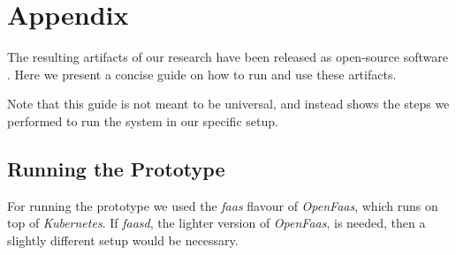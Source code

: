 \chapter{Appendix}

The resulting artifacts of our research have been released as open-source software \cite{thesis-github}. Here we present a concise guide on how to run and use these artifacts.

Note that this guide is not meant to be universal, and instead shows the steps we performed to run the system in our specific setup.

\section{Running the Prototype}
For running the prototype we used the \textit{faas} flavour of \textit{OpenFaas}, which runs on top of \textit{Kubernetes}. If \textit{faasd}, the lighter version of \textit{OpenFaas}, is needed, then a slightly different setup would be necessary.


